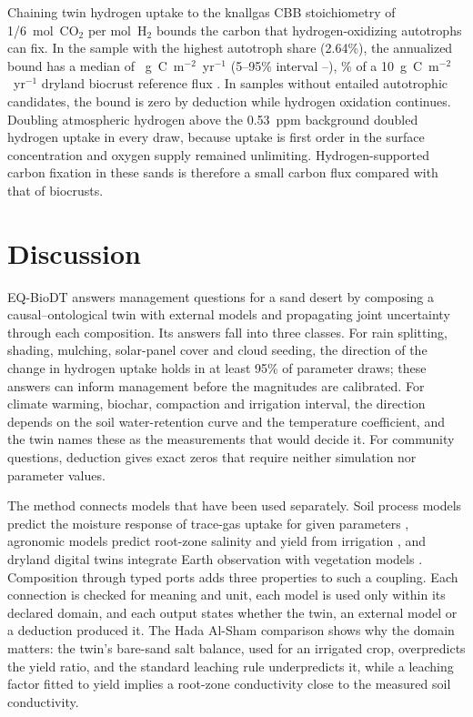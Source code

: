 \documentclass[11pt,a4paper]{article}
\begin{document}
Chaining twin hydrogen uptake to the knallgas CBB stoichiometry of 1/6~mol~CO$_2$ per mol~H$_2$ \cite{bongers1970energy} bounds the carbon that hydrogen-oxidizing autotrophs can fix. In the sample with the highest autotroph share (2.64\%), the annualized bound has a median of \QCarbonBoundMedian{}~g~C~m$^{-2}$~yr$^{-1}$ (5--95\% interval \QCarbonBoundLow{}--\QCarbonBoundHigh{}), \QCarbonBoundPctTen\% of a 10~g~C~m$^{-2}$~yr$^{-1}$ dryland biocrust reference flux \cite{elbert2012cryptogamic}. In samples without entailed autotrophic candidates, the bound is zero by deduction while hydrogen oxidation continues. Doubling atmospheric hydrogen above the 0.53~ppm background \cite{novelli1999h2} doubled hydrogen uptake in every draw, because uptake is first order in the surface concentration and oxygen supply remained unlimiting. Hydrogen-supported carbon fixation in these sands is therefore a small carbon flux compared with that of biocrusts.

\section{Discussion}
EQ-BioDT answers management questions for a sand desert by composing a causal--ontological twin with external models and propagating joint uncertainty through each composition. Its answers fall into three classes. For rain splitting, shading, mulching, solar-panel cover and cloud seeding, the direction of the change in hydrogen uptake holds in at least 95\% of parameter draws; these answers can inform management before the magnitudes are calibrated. For climate warming, biochar, compaction and irrigation interval, the direction depends on the soil water-retention curve and the temperature coefficient, and the twin names these as the measurements that would decide it. For community questions, deduction gives exact zeros that require neither simulation nor parameter values.

The method connects models that have been used separately. Soil process models predict the moisture response of trace-gas uptake for given parameters \cite{bertagni2021moisture}, agronomic models predict root-zone salinity and yield from irrigation \cite{ayers1985fao29,allen1998fao56}, and dryland digital twins integrate Earth observation with vegetation models \cite{twindrylands}. Composition through typed ports adds three properties to such a coupling. Each connection is checked for meaning and unit, each model is used only within its declared domain, and each output states whether the twin, an external model or a deduction produced it. The Hada Al-Sham comparison shows why the domain matters: the twin's bare-sand salt balance, used for an irrigated crop, overpredicts the yield ratio, and the standard leaching rule underpredicts it, while a leaching factor fitted to yield implies a root-zone conductivity close to the measured soil conductivity.
\end{document}
